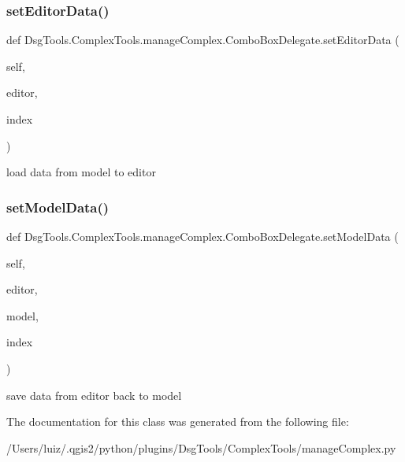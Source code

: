 \subsubsection{\texorpdfstring{set\+Editor\+Data()}{setEditorData()}}
{\footnotesize\ttfamily def Dsg\+Tools.\+Complex\+Tools.\+manage\+Complex.\+Combo\+Box\+Delegate.\+set\+Editor\+Data (\begin{DoxyParamCaption}\item[{}]{self,  }\item[{}]{editor,  }\item[{}]{index }\end{DoxyParamCaption})}

\begin{DoxyVerb}load data from model to editor
\end{DoxyVerb}
 \mbox{\label{class_dsg_tools_1_1_complex_tools_1_1manage_complex_1_1_combo_box_delegate_a68c7e32449f402268047cf6cffb41c25}} 
\subsubsection{\texorpdfstring{set\+Model\+Data()}{setModelData()}}
{\footnotesize\ttfamily def Dsg\+Tools.\+Complex\+Tools.\+manage\+Complex.\+Combo\+Box\+Delegate.\+set\+Model\+Data (\begin{DoxyParamCaption}\item[{}]{self,  }\item[{}]{editor,  }\item[{}]{model,  }\item[{}]{index }\end{DoxyParamCaption})}

\begin{DoxyVerb}save data from editor back to model
\end{DoxyVerb}
 

The documentation for this class was generated from the following file\+:\begin{DoxyCompactItemize}
\item 
/\+Users/luiz/.\+qgis2/python/plugins/\+Dsg\+Tools/\+Complex\+Tools/manage\+Complex.\+py\end{DoxyCompactItemize}
